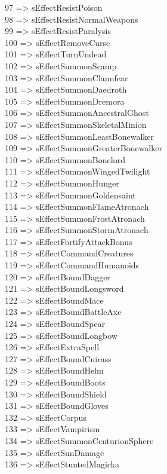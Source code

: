 97 =\textgreater{} sEffectResistPoison\\
98 =\textgreater{} sEffectResistNormalWeapons\\
99 =\textgreater{} sEffectResistParalysis\\
100 =\textgreater{} sEffectRemoveCurse\\
101 =\textgreater{} sEffectTurnUndead\\
102 =\textgreater{} sEffectSummonScamp\\
103 =\textgreater{} sEffectSummonClannfear\\
104 =\textgreater{} sEffectSummonDaedroth\\
105 =\textgreater{} sEffectSummonDremora\\
106 =\textgreater{} sEffectSummonAncestralGhost\\
107 =\textgreater{} sEffectSummonSkeletalMinion\\
108 =\textgreater{} sEffectSummonLeastBonewalker\\
109 =\textgreater{} sEffectSummonGreaterBonewalker\\
110 =\textgreater{} sEffectSummonBonelord\\
111 =\textgreater{} sEffectSummonWingedTwilight\\
112 =\textgreater{} sEffectSummonHunger\\
113 =\textgreater{} sEffectSummonGoldensaint\\
114 =\textgreater{} sEffectSummonFlameAtronach\\
115 =\textgreater{} sEffectSummonFrostAtronach\\
116 =\textgreater{} sEffectSummonStormAtronach\\
117 =\textgreater{} sEffectFortifyAttackBonus\\
118 =\textgreater{} sEffectCommandCreatures\\
119 =\textgreater{} sEffectCommandHumanoids\\
120 =\textgreater{} sEffectBoundDagger\\
121 =\textgreater{} sEffectBoundLongsword\\
122 =\textgreater{} sEffectBoundMace\\
123 =\textgreater{} sEffectBoundBattleAxe\\
124 =\textgreater{} sEffectBoundSpear\\
125 =\textgreater{} sEffectBoundLongbow\\
126 =\textgreater{} sEffectExtraSpell\\
127 =\textgreater{} sEffectBoundCuirass\\
128 =\textgreater{} sEffectBoundHelm\\
129 =\textgreater{} sEffectBoundBoots\\
130 =\textgreater{} sEffectBoundShield\\
131 =\textgreater{} sEffectBoundGloves\\
132 =\textgreater{} sEffectCorpus\\
133 =\textgreater{} sEffectVampirism\\
134 =\textgreater{} sEffectSummonCenturionSphere\\
135 =\textgreater{} sEffectSunDamage\\
136 =\textgreater{} sEffectStuntedMagicka


